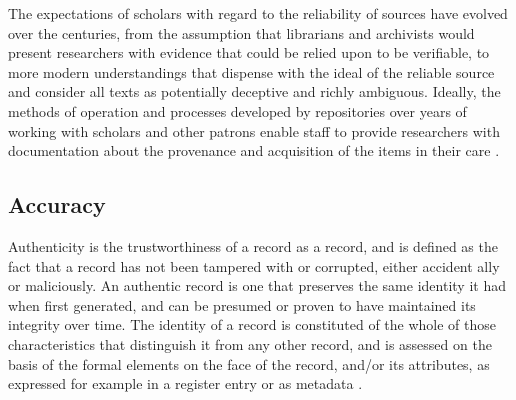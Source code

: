 The expectations of scholars with regard to the reliability of sources have evolved over the centuries, from the assumption that librarians and archivists would present researchers with evidence that could be relied upon to be verifiable, to more modern understandings that dispense with the ideal of the reliable source and consider all texts as potentially deceptive and richly ambiguous. Ideally, the methods of operation and processes developed by repositories over years of working with scholars and other patrons enable staff to provide researchers with documentation about the provenance and acquisition of the items in their care \cite[32]{kirschenbaum2010digital}.

\subsection{Accuracy}
Authenticity is the trustworthiness of a record as a record, and is defined as the fact that a record has not been tampered with or corrupted, either accident ally or maliciously. An authentic record is one that preserves the same identity it had when first generated, and can be presumed or proven to have maintained its integrity over time. The identity of a record is constituted of the whole of those characteristics that distinguish it from any other record, and is assessed on the basis of the formal elements on the face of the record, and/or its attributes, as expressed for example in a register entry or as metadata \cite[52]{duranti2009digital}.

